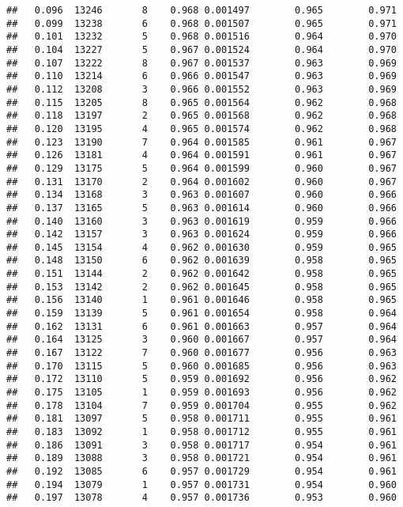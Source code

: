 \documentclass[
]{book}
\begin{document}
\begin{verbatim}
##   0.096  13246       8    0.968 0.001497        0.965        0.971
##   0.099  13238       6    0.968 0.001507        0.965        0.971
##   0.101  13232       5    0.968 0.001516        0.964        0.970
##   0.104  13227       5    0.967 0.001524        0.964        0.970
##   0.107  13222       8    0.967 0.001537        0.963        0.969
##   0.110  13214       6    0.966 0.001547        0.963        0.969
##   0.112  13208       3    0.966 0.001552        0.963        0.969
##   0.115  13205       8    0.965 0.001564        0.962        0.968
##   0.118  13197       2    0.965 0.001568        0.962        0.968
##   0.120  13195       4    0.965 0.001574        0.962        0.968
##   0.123  13190       7    0.964 0.001585        0.961        0.967
##   0.126  13181       4    0.964 0.001591        0.961        0.967
##   0.129  13175       5    0.964 0.001599        0.960        0.967
##   0.131  13170       2    0.964 0.001602        0.960        0.967
##   0.134  13168       3    0.963 0.001607        0.960        0.966
##   0.137  13165       5    0.963 0.001614        0.960        0.966
##   0.140  13160       3    0.963 0.001619        0.959        0.966
##   0.142  13157       3    0.963 0.001624        0.959        0.966
##   0.145  13154       4    0.962 0.001630        0.959        0.965
##   0.148  13150       6    0.962 0.001639        0.958        0.965
##   0.151  13144       2    0.962 0.001642        0.958        0.965
##   0.153  13142       2    0.962 0.001645        0.958        0.965
##   0.156  13140       1    0.961 0.001646        0.958        0.965
##   0.159  13139       5    0.961 0.001654        0.958        0.964
##   0.162  13131       6    0.961 0.001663        0.957        0.964
##   0.164  13125       3    0.960 0.001667        0.957        0.964
##   0.167  13122       7    0.960 0.001677        0.956        0.963
##   0.170  13115       5    0.960 0.001685        0.956        0.963
##   0.172  13110       5    0.959 0.001692        0.956        0.962
##   0.175  13105       1    0.959 0.001693        0.956        0.962
##   0.178  13104       7    0.959 0.001704        0.955        0.962
##   0.181  13097       5    0.958 0.001711        0.955        0.961
##   0.183  13092       1    0.958 0.001712        0.955        0.961
##   0.186  13091       3    0.958 0.001717        0.954        0.961
##   0.189  13088       3    0.958 0.001721        0.954        0.961
##   0.192  13085       6    0.957 0.001729        0.954        0.961
##   0.194  13079       1    0.957 0.001731        0.954        0.960
##   0.197  13078       4    0.957 0.001736        0.953        0.960

\end{verbatim}
\end{document}
